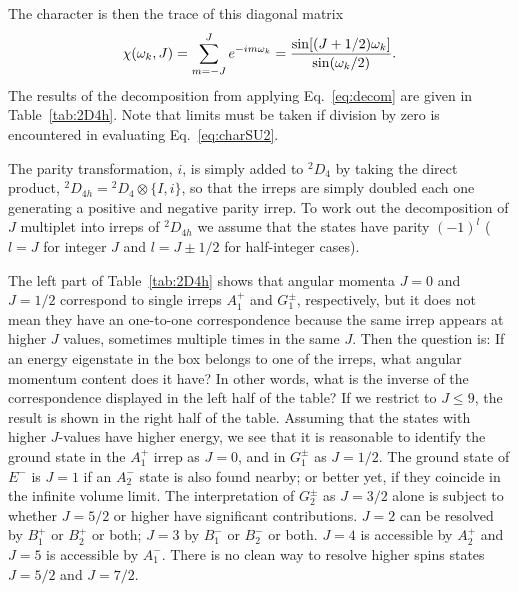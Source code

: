 \documentclass[aps,prd,reprint,showpacs,floatfix,longbibliography,,superscriptaddress]{revtex4-1}
\def\beq{\begin{equation}}
\def\eeq{\end{equation}}
\begin{document}
\begin{widetext}
The character is then the trace of this diagonal matrix
\beq
\chi(\omega_k,J) =\sum_{m=-J}^{J} e^{-i m \omega_k} = {\sin[(J+1/2) \omega_k ]\over \sin(\omega_k/2)}.
\label{eq:charSU2}
\eeq
The results of the decomposition from applying Eq.~\ref{eq:decom} are given in Table~\ref{tab:2D4h}.
Note that limits must be taken if division by zero is encountered in evaluating Eq.~\ref{eq:charSU2}.

The parity transformation, $i$, is simply added to $^2D_{4}$ by taking the direct product,
$^2D_{4h}={^2D_{4}}\otimes \{I, i\}$, so that the irreps are simply doubled each one
generating a positive and negative parity irrep. To work out the decomposition of $J$
multiplet into irreps of $^2D_{4h}$ we assume that the states have parity $(-1)^l$
($l=J$ for integer $J$ and $l=J\pm1/2$ for half-integer cases).

The left part of  Table~\ref{tab:2D4h} shows that angular momenta $J= 0$ and $J=1/2$ 
correspond to single irreps $A^+_1$ and $G^\pm_1$, respectively, 
but it does not mean they have an one-to-one correspondence because 
the same irrep appears at higher $J$ values, sometimes multiple times in the same $J$. Then the question is:
If an energy eigenstate in the box belongs to one of the irreps, what angular momentum content does it have? 
In other words, what is the inverse of the correspondence displayed in the left half of the table?
If we restrict to $J\leq 9$, the result is shown in the right half of the table.
Assuming that the states with higher $J$-values have higher energy,
we see that it is reasonable to identify the ground state in the $A^+_1$ irrep as $J=0$, and in $G^\pm_1$ as $J=1/2$. 
The ground state of $E^-$ is $J=1$ if an $A^-_2$ state is also found nearby; or better yet,  if they coincide in the infinite volume limit.
The interpretation of $G^\pm_2$ as $J = 3/2$ alone is subject to whether $J = 5/2$ or higher have significant contributions.  $J=2$ can be resolved by $B^+_1$ or $B^+_2$ or both; $J=3$  by $B^-_1$ or $B^-_2$ or both.
$J=4$ is accessible by $A^+_2$ and $J=5$ is accessible by $A^-_1$. 
There is no clean way to resolve higher spins states $J=5/2$ and $J=7/2$.
 


\end{widetext}
\end{document}
